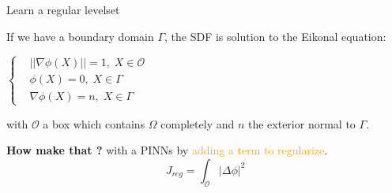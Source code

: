 \begin{frame}{Learn a regular levelset}	
	\vspace{-10pt}
	\begin{tcolorbox}[
		colback=other, %
		colframe=other, %
		arc=2mm, %
		boxrule=0.5pt, %
		breakable, enhanced jigsaw,
		width=\linewidth,
		opacityback=0.1
		]
		
		If we have a boundary domain $\Gamma$, the SDF is solution to the Eikonal equation:
		
		\begin{minipage}{\linewidth}
			\centering
			$\left\{\begin{aligned}
				&||\nabla\phi(X)||=1, \; X\in\mathcal{O} \\
				&\phi(X)=0, \; X\in\Gamma \\
				&\nabla\phi(X)=n, \; X\in\Gamma
			\end{aligned}\right.$
		\end{minipage}
		
		with $\mathcal{O}$ a box which contains $\Omega$ completely and $n$ the exterior normal to $\Gamma$.
	\end{tcolorbox}

	\textbf{How make that ?} with a PINNs \cite{clemot_neural_2023} by \textcolor{orange}{adding a term to regularize}.
	\vspace{-5pt}
	\begin{equation*}
		J_{reg} = \int_\mathcal{O} |\Delta\phi|^2
	\end{equation*}

	\begin{minipage}{0.32\linewidth}
		\centering
	\end{minipage} 
	\begin{minipage}{0.32\linewidth}
		\centering
	\end{minipage} 
	\begin{minipage}{0.32\linewidth}
		\centering
	\end{minipage} 
\end{frame}

